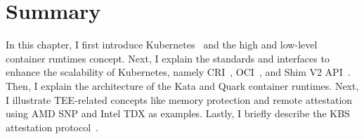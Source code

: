 \section{Summary}
In this chapter, I first introduce Kubernetes~\cite*{k8s} and the high and low-level container runtimes concept. Next, I explain the standards and interfaces to enhance the scalability of Kubernetes, namely CRI~\cite*{cri-interface}, OCI~\cite*{oci-runtime-spec}, and Shim V2 API~\cite*{shim_v2}. Then, I explain the architecture of the Kata and Quark container runtimes. 
Next, I illustrate TEE-related concepts like memory protection and remote attestation using AMD SNP and Intel TDX as examples. Lastly, I briefly describe the KBS attestation protocol~\cite*{kbs_Attestation_protocol}.
\cleardoublepage

